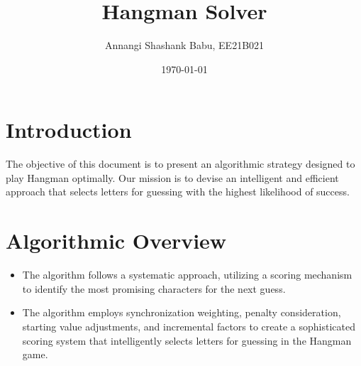 \documentclass[titlepage, 11pt]{article}
\begin{document}
\title{
  {Hangman Solver}
}
\author{Annangi Shashank Babu, EE21B021}

\date{\today}
\maketitle
\newpage
\setcounter{page}{1}
\section{Introduction}%
\label{sec:label}
The objective of this document is to present an algorithmic strategy designed to play Hangman optimally. Our mission is to devise an intelligent and efficient approach that selects letters for guessing with the highest likelihood of success.
\section{Algorithmic Overview}
\begin{itemize}
    \item The algorithm follows a systematic approach, utilizing a scoring mechanism to identify the most promising characters for the next guess.
    \item The algorithm employs synchronization weighting, penalty consideration, starting value adjustments, and incremental factors to create a sophisticated scoring system that intelligently selects letters for guessing in the Hangman game.
\end{itemize}
\end{document}
